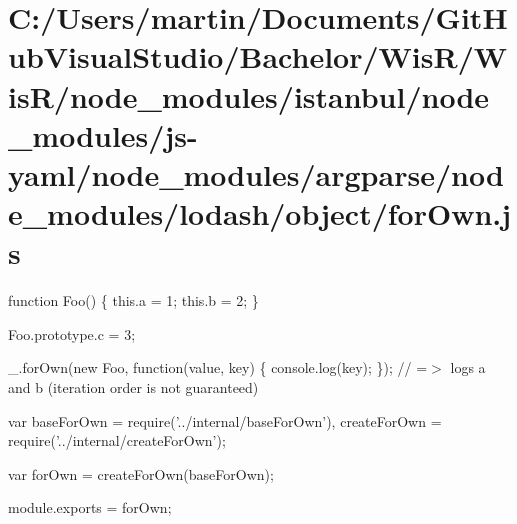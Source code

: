 \hypertarget{_c_1_2_users_2martin_2_documents_2_git_hub_visual_studio_2_bachelor_2_wis_r_2_wis_r_2node_modulefac57bd202ef6c04e1b1569c458e639b}{}\section{C\+:/\+Users/martin/\+Documents/\+Git\+Hub\+Visual\+Studio/\+Bachelor/\+Wis\+R/\+Wis\+R/node\+\_\+modules/istanbul/node\+\_\+modules/js-\/yaml/node\+\_\+modules/argparse/node\+\_\+modules/lodash/object/for\+Own.\+js}
function Foo() \{ this.\+a = 1; this.\+b = 2; \}

Foo.\+prototype.\+c = 3;

\+\_\+.\+for\+Own(new Foo, function(value, key) \{ console.\+log(key); \}); // =$>$ logs \textquotesingle{}a\textquotesingle{} and \textquotesingle{}b\textquotesingle{} (iteration order is not guaranteed)


\begin{DoxyCodeInclude}
var baseForOwn = require(\textcolor{stringliteral}{'../internal/baseForOwn'}),
    createForOwn = require(\textcolor{stringliteral}{'../internal/createForOwn'});

var forOwn = createForOwn(baseForOwn);

module.exports = forOwn;
\end{DoxyCodeInclude}
 